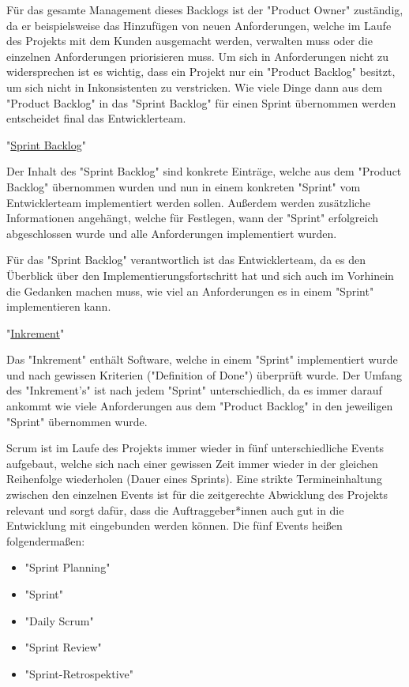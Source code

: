 Für das gesamte Management dieses Backlogs ist der "Product Owner" zuständig, da er beispielsweise das Hinzufügen von neuen Anforderungen, welche im Laufe des Projekts mit dem Kunden ausgemacht werden, verwalten muss oder die einzelnen Anforderungen priorisieren muss. Um sich in Anforderungen nicht zu widersprechen ist es wichtig, dass ein Projekt nur ein "Product Backlog" besitzt, um sich nicht in Inkonsistenten zu verstricken. Wie viele Dinge dann aus dem "Product Backlog" in das "Sprint Backlog" für einen Sprint übernommen werden entscheidet final das Entwicklerteam. \cite{ProductBacklog}

"\underline{Sprint Backlog}"

Der Inhalt des "Sprint Backlog" sind konkrete Einträge, welche aus dem "Product Backlog" übernommen wurden und nun in einem konkreten "Sprint" vom Entwicklerteam implementiert werden sollen. Außerdem werden zusätzliche Informationen angehängt, welche für Festlegen, wann der "Sprint" erfolgreich abgeschlossen wurde und alle Anforderungen implementiert wurden. 

Für das "Sprint Backlog" verantwortlich ist das Entwicklerteam, da es den Überblick über den Implementierungsfortschritt hat und sich auch im Vorhinein die Gedanken machen muss, wie viel an Anforderungen es in einem "Sprint" implementieren kann. \cite{SprintBacklog}

"\underline{Inkrement}"

Das "Inkrement" enthält Software, welche in einem "Sprint" implementiert wurde und nach gewissen Kriterien ("Definition of Done") überprüft wurde. Der Umfang des "Inkrement's" ist nach jedem "Sprint" unterschiedlich, da es immer darauf ankommt wie viele Anforderungen aus dem "Product Backlog" in den jeweiligen "Sprint" übernommen wurde. \cite{Inkrement}


Scrum ist im Laufe des Projekts immer wieder in fünf unterschiedliche Events aufgebaut, welche sich nach einer gewissen Zeit immer wieder in der gleichen Reihenfolge wiederholen (Dauer eines Sprints). Eine strikte Termineinhaltung zwischen den einzelnen Events ist für die zeitgerechte Abwicklung des Projekts relevant und sorgt dafür, dass die Auftraggeber*innen auch gut in die Entwicklung mit eingebunden werden können. Die fünf Events heißen folgendermaßen:

\begin{itemize}
    \item "Sprint Planning"
    \item "Sprint"
    \item "Daily Scrum"
    \item "Sprint Review"
    \item "Sprint-Retrospektive"
\end{itemize}

